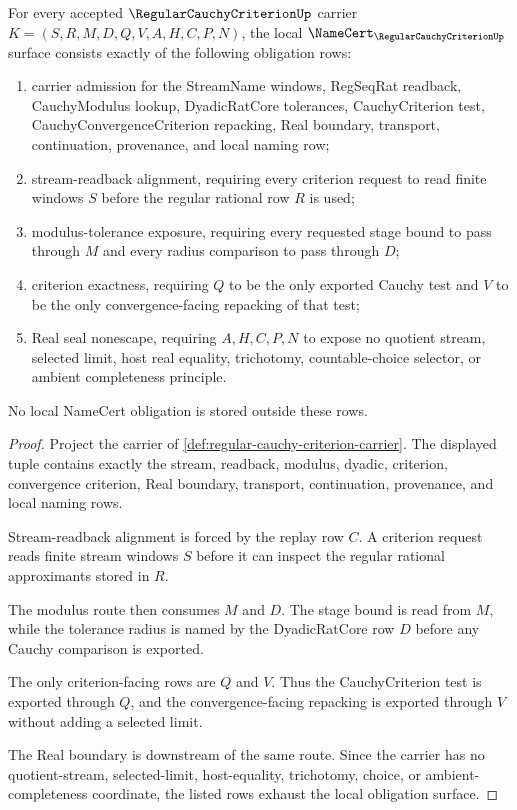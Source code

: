 \begin{theorem}
\label{thm:regular-cauchy-criterion-namecert-obligations}
For every accepted $\RegularCauchyCriterionUp$ carrier $K=(S,R,M,D,Q,V,A,H,C,P,N)$, the local $\NameCert_{\RegularCauchyCriterionUp}$ surface consists exactly of the following obligation rows:
\begin{enumerate}
\item carrier admission for the StreamName windows, RegSeqRat readback, CauchyModulus lookup, DyadicRatCore tolerances, CauchyCriterion test, CauchyConvergenceCriterion repacking, Real boundary, transport, continuation, provenance, and local naming row;
\item stream-readback alignment, requiring every criterion request to read finite windows $S$ before the regular rational row $R$ is used;
\item modulus-tolerance exposure, requiring every requested stage bound to pass through $M$ and every radius comparison to pass through $D$;
\item criterion exactness, requiring $Q$ to be the only exported Cauchy test and $V$ to be the only convergence-facing repacking of that test;
\item Real seal nonescape, requiring $A,H,C,P,N$ to expose no quotient stream, selected limit, host real equality, trichotomy, countable-choice selector, or ambient completeness principle.
\end{enumerate}
No local NameCert obligation is stored outside these rows.
\end{theorem}
\begin{proof}
Project the carrier of \autoref{def:regular-cauchy-criterion-carrier}. The displayed tuple contains exactly the stream, readback, modulus, dyadic, criterion, convergence criterion, Real boundary, transport, continuation, provenance, and local naming rows.

Stream-readback alignment is forced by the replay row $C$. A criterion request reads finite stream windows $S$ before it can inspect the regular rational approximants stored in $R$.

The modulus route then consumes $M$ and $D$. The stage bound is read from $M$, while the tolerance radius is named by the DyadicRatCore row $D$ before any Cauchy comparison is exported.

The only criterion-facing rows are $Q$ and $V$. Thus the CauchyCriterion test is exported through $Q$, and the convergence-facing repacking is exported through $V$ without adding a selected limit.

The Real boundary is downstream of the same route. Since the carrier has no quotient-stream, selected-limit, host-equality, trichotomy, choice, or ambient-completeness coordinate, the listed rows exhaust the local obligation surface.
\end{proof}

